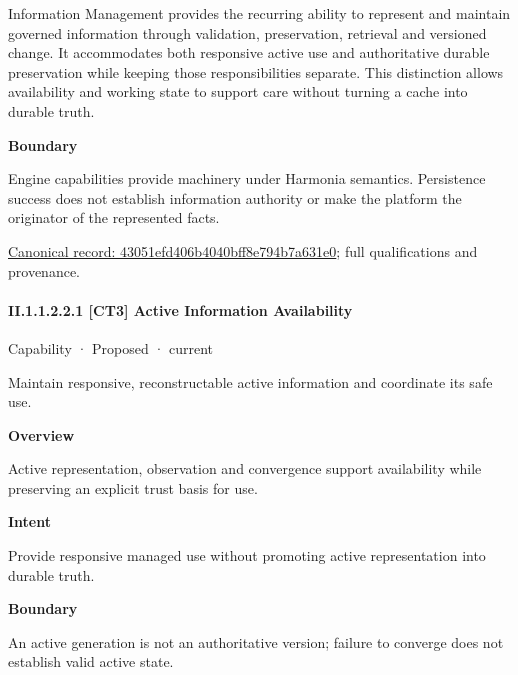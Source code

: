 Information Management provides the recurring ability to represent and maintain governed information through validation, preservation, retrieval and versioned change. It accommodates both responsive active use and authoritative durable preservation while keeping those responsibilities separate. This distinction allows availability and working state to support care without turning a cache into durable truth.



\textbf{Boundary}



Engine capabilities provide machinery under Harmonia semantics. Persistence success does not establish information authority or make the platform the originator of the represented facts.


{\footnotesize \href{../../../../../../../continuum/strategy/capability/43051efd406b4040bff8e794b7a631e0.md}{Canonical record: 43051efd406b4040bff8e794b7a631e0}; full qualifications and provenance.}\par
\paragraph*{II.1.1.2.2.1 [CT3] Active Information Availability}
\label{navigation:II.1.1.2.2.1}

\label{element:bb711f4d8fb74af2917869b9b05f7f84}
{\small Capability · Proposed · current}\par

Maintain responsive, reconstructable active information and coordinate its safe use.



\textbf{Overview}



Active representation, observation and convergence support availability while preserving an explicit trust basis for use.



\textbf{Intent}



Provide responsive managed use without promoting active representation into durable truth.



\textbf{Boundary}



An active generation is not an authoritative version; failure to converge does not establish valid active state.


